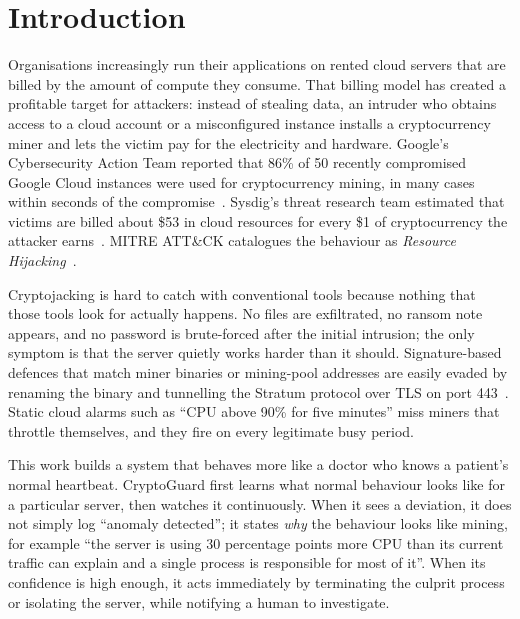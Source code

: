 \documentclass[conference]{IEEEtran}
\begin{document}
\section{Introduction}
Organisations increasingly run their applications on rented cloud servers that are billed by the amount of compute they consume. That billing model has created a profitable target for attackers: instead of stealing data, an intruder who obtains access to a cloud account or a misconfigured instance installs a cryptocurrency miner and lets the victim pay for the electricity and hardware. Google's Cybersecurity Action Team reported that 86\% of 50 recently compromised Google Cloud instances were used for cryptocurrency mining, in many cases within seconds of the compromise~\cite{google2021threat}. Sysdig's threat research team estimated that victims are billed about \$53 in cloud resources for every \$1 of cryptocurrency the attacker earns~\cite{sysdig2022}. MITRE ATT\&CK catalogues the behaviour as \emph{Resource Hijacking}~\cite{mitre_t1496}.

Cryptojacking is hard to catch with conventional tools because nothing that those tools look for actually happens. No files are exfiltrated, no ransom note appears, and no password is brute-forced after the initial intrusion; the only symptom is that the server quietly works harder than it should. Signature-based defences that match miner binaries or mining-pool addresses are easily evaded by renaming the binary and tunnelling the Stratum protocol over TLS on port 443~\cite{tekiner2021sok,pastor2020}. Static cloud alarms such as ``CPU above 90\% for five minutes'' miss miners that throttle themselves, and they fire on every legitimate busy period.

This work builds a system that behaves more like a doctor who knows a patient's normal heartbeat. CryptoGuard first learns what normal behaviour looks like for a particular server, then watches it continuously. When it sees a deviation, it does not simply log ``anomaly detected''; it states \emph{why} the behaviour looks like mining, for example ``the server is using 30 percentage points more CPU than its current traffic can explain and a single process is responsible for most of it''. When its confidence is high enough, it acts immediately by terminating the culprit process or isolating the server, while notifying a human to investigate.
\end{document}
